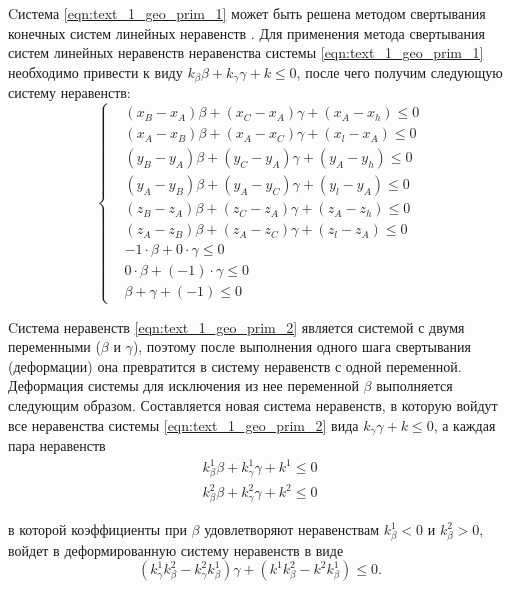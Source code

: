 Cистема \eqref{eqn:text_1_geo_prim_1} может быть решена методом свертывания конечных систем линейных неравенств \cite{Chernikov1963}.
Для применения метода свертывания систем линейных неравенств неравенства системы \eqref{eqn:text_1_geo_prim_1} необходимо привести к виду $k_{\beta}\beta + k_{\gamma}\gamma + k \le 0$, после чего получим следующую систему неравенств:
\begin{equation}\label{eqn:text_1_geo_prim_2}
	\left\{
		\begin{aligned}
			& (x_B - x_A) \beta + (x_C - x_A) \gamma + (x_A - x_h) \le 0 \\
			& (x_A - x_B) \beta + (x_A - x_C) \gamma + (x_l - x_A) \le 0 \\
			& (y_B - y_A) \beta + (y_C - y_A) \gamma + (y_A - y_h) \le 0 \\
			& (y_A - y_B) \beta + (y_A - y_C) \gamma + (y_l - y_A) \le 0 \\
			& (z_B - z_A) \beta + (z_C - z_A) \gamma + (z_A - z_h) \le 0 \\
			& (z_A - z_B) \beta + (z_A - z_C) \gamma + (z_l - z_A) \le 0 \\
			& -1 \cdot \beta + 0 \cdot \gamma \le 0 \\
			& 0 \cdot \beta + (-1) \cdot \gamma \le 0 \\
			& \beta + \gamma + (-1) \le 0
		\end{aligned}
	\right.
\end{equation}

Cистема неравенств \eqref{eqn:text_1_geo_prim_2} является системой с двумя переменными ($\beta$ и $\gamma$), поэтому после выполнения одного шага свертывания (деформации) она превратится в систему неравенств с одной переменной.
Деформация системы для исключения из нее переменной $\beta$ выполняется следующим образом.
Составляется новая система неравенств, в которую войдут все неравенства системы \eqref{eqn:text_1_geo_prim_2} вида $k_{\gamma} \gamma + k \le 0$, а каждая пара неравенств
\begin{equation}
	\begin{aligned}
		k_{\beta}^1 \beta + k_{\gamma}^1 \gamma + k^1 \le 0 \\
		k_{\beta}^2 \beta + k_{\gamma}^2 \gamma + k^2 \le 0
	\end{aligned}
\end{equation}

в которой коэффициенты при $\beta$ удовлетворяют неравенствам $k_{\beta}^1 < 0$ и $k_{\beta}^2 > 0$, войдет в деформированную систему неравенств в виде
\begin{equation}
	(k_{\gamma}^1 k_{\beta}^2 - k_{\gamma}^2 k_{\beta}^1) \gamma + (k^1 k_{\beta}^2 - k^2 k_{\beta}^1) \le 0. 
\end{equation}

